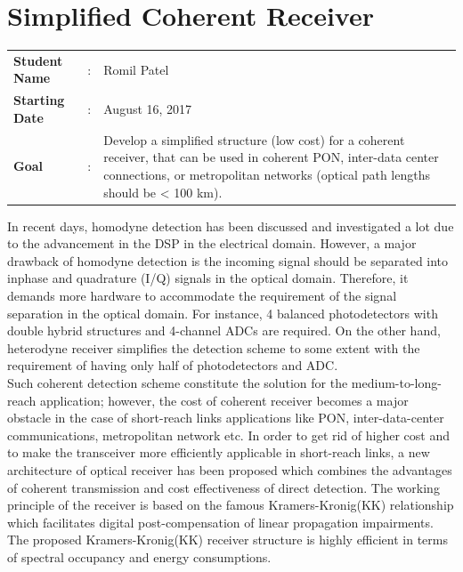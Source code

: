 \clearpage
\section{Simplified Coherent Receiver}

\begin{tcolorbox}	
\begin{tabular}{p{2.75cm} p{0.2cm} p{10.5cm}} 	
\textbf{Student Name}  &:& Romil Patel\\
\textbf{Starting Date} &:& August 16, 2017\\
\textbf{Goal}          &:& Develop a simplified structure (low cost) for a coherent receiver, that can be used in coherent PON, inter-data center connections, or metropolitan networks (optical path lengths should be < 100 km).
\end{tabular}
\end{tcolorbox}

In recent days, homodyne detection has been discussed and investigated a lot due to the advancement in the DSP in the electrical domain. However, a major drawback of homodyne detection is the incoming signal should be separated into inphase and quadrature (I/Q) signals in the optical domain. Therefore, it demands more hardware to accommodate the requirement of the signal separation  in the optical domain. For instance, 4 balanced photodetectors with double hybrid structures and 4-channel ADCs are required.
On the other hand, heterodyne receiver simplifies the detection scheme to some extent with the requirement of having only half of photodetectors and ADC.\\
Such coherent detection scheme constitute the solution for the medium-to-long-reach application; however, the cost of coherent receiver becomes a major obstacle in the case of short-reach links applications like PON, inter-data-center communications, metropolitan network etc. In order to get rid of higher cost and to make the transceiver more efficiently applicable in short-reach links, a new architecture of optical receiver has been proposed which combines the advantages of coherent transmission and cost effectiveness of direct detection. The working principle of the receiver is based on the famous Kramers-Kronig(KK) relationship which facilitates digital post-compensation of linear propagation impairments. The proposed Kramers-Kronig(KK) receiver structure is highly efficient in terms of spectral occupancy and energy consumptions.
